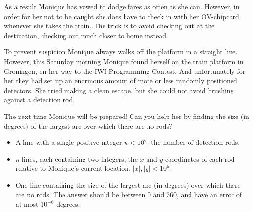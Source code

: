 


\def\MineName{Monique}

{\StandaardZin}
As a result {\MineName} has vowed to dodge fares as often as she can.
However, in order for her not to be caught she does have to check in with her OV-chipcard whenever she takes the train.
The trick is to avoid checking out at the destination, checking out much closer to home instead.

To prevent suspicion {\MineName} always walks off the platform in a straight line.
However, this Saturday morning {\MineName} found herself on the train platform in Groningen, on her way to the IWI Programming Contest.
And unfortunately for her they had set up an enormous amount of more or less randomly positioned detectors.
She tried making a clean escape, but she could not avoid brushing against a detection rod.

The next time {\MineName} will be prepared!
Can you help her by finding the size (in degrees) of the largest arc over which there are no rods?

\Input
\begin{itemize}
 \item A line with a single positive integer $n < 10^6$, the number of detection rods.
 \item $n$ lines, each containing two integers, the $x$ and $y$ coordinates of each rod relative to {\MineName}'s current location. $|x|,|y|<10^6$.
\end{itemize}

\Output
\begin{itemize}
 \item One line containing the size of the largest arc (in degrees) over which there are no rods.
       The answer should be between $0$ and $360$, and have an error of at most $10^{-6}$ degrees.
\end{itemize}

\vfill %
\Example
